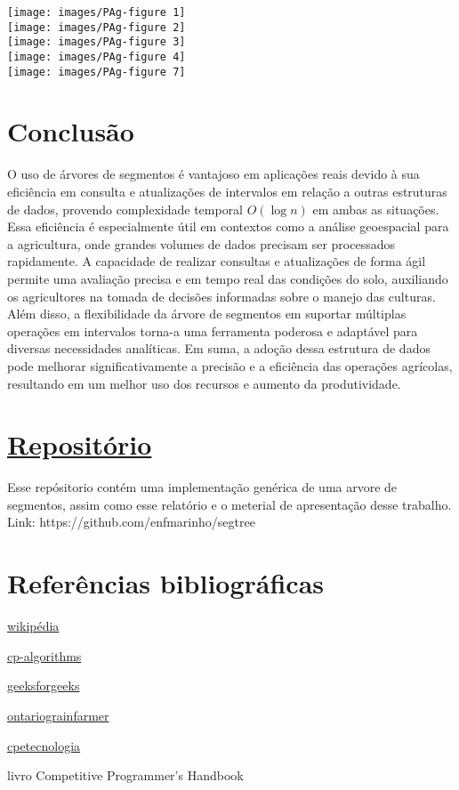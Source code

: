 \documentclass{article}
\begin{document}
\texttt{[image: images/PAg-figure 1]} \\
\texttt{[image: images/PAg-figure 2]} \\
\texttt{[image: images/PAg-figure 3]} \\
\texttt{[image: images/PAg-figure 4]} \\
\texttt{[image: images/PAg-figure 7]} \\

\section{Conclusão}
\leavevmode
\indent O uso de árvores de segmentos é vantajoso em aplicações reais devido à sua eficiência em consulta e atualizações de intervalos em relação a outras estruturas de dados, provendo complexidade temporal \(O(\log n)\) em ambas as situações. Essa eficiência é especialmente útil em contextos como a análise geoespacial para a agricultura, onde grandes volumes de dados precisam ser processados rapidamente. A capacidade de realizar consultas e atualizações de forma ágil permite uma avaliação precisa e em tempo real das condições do solo, auxiliando os agricultores na tomada de decisões informadas sobre o manejo das culturas. Além disso, a flexibilidade da árvore de segmentos em suportar múltiplas operações em intervalos torna-a uma ferramenta poderosa e adaptável para diversas necessidades analíticas. Em suma, a adoção dessa estrutura de dados pode melhorar significativamente a precisão e a eficiência das operações agrícolas, resultando em um melhor uso dos recursos e aumento da produtividade.

\section{\href{https://github.com/enfmarinho/segtree}{Repositório}}
Esse repósitorio contém uma implementação genérica de uma arvore de segmentos, assim como esse relatório e o meterial de apresentação desse trabalho.
Link: https://github.com/enfmarinho/segtree

\section{Referências bibliográficas}
\begin{description}
\item \href{https://en.wikipedia.org/wiki/Segment_tree}{wikipédia}
\item \href{https://cp-algorithms.com/data_structures/segment_tree.html}{cp-algorithms}
\item \href{https://www.geeksforgeeks.org/segment-tree-data-structure/}{geeksforgeeks}
\item \href{https://ontariograinfarmer.ca/2015/04/01/understanding-precision-agriculture-3/}{ontariograinfarmer} 
\item \href{https://blog.cpetecnologia.com.br/voce-sabe-como-funciona-o-sistema-rtk-descubra-agora-mesmo/}{cpetecnologia}
\item livro Competitive Programmer's Handbook
\end{description}
\leavevmode

\maketitle
\end{document}
